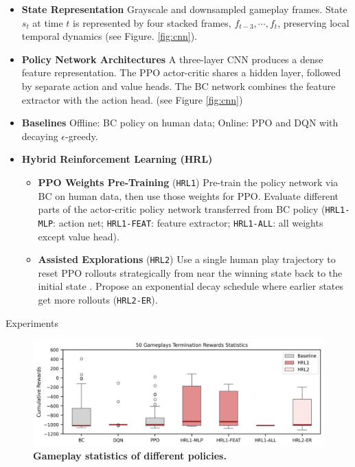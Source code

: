 \documentclass[final]{beamer}
\newlength{\colwidth}
\begin{document}
\begin{frame}[t]
\begin{columns}[t]
\begin{column}{\colwidth}
\begin{minipage}{\textwidth}
    \begin{itemize}

    \item \textbf{State Representation} Grayscale and downsampled gameplay frames. 
    State $s_t$ at time $t$ is represented by four stacked frames, 
    ${f_{t-3}, \cdots, f_t}$, preserving local temporal dynamics (see Figure. \ref{fig:cnn}).
    
    \item \textbf{Policy Network Architectures} 
    A three-layer CNN produces a 
    dense feature representation. The PPO actor-critic shares a hidden layer, 
    followed by separate action and value heads. The BC network combines the 
    feature extractor with the action head. (see Figure \ref{fig:cnn})

      \item \textbf{Baselines} Offline: BC policy on human data; 
      Online: PPO and DQN with decaying $\epsilon$-greedy.
      \item \textbf{Hybrid Reinforcement Learning (HRL)}
      \begin{itemize}
        \item \textbf{PPO Weights Pre-Training} (\texttt{HRL1}) Pre-train the policy 
        network via BC on human data, then use those weights for PPO. Evaluate different parts of the 
        actor-critic policy network transferred from BC policy (\texttt{HRL1-MLP}: action net; 
        \texttt{HRL1-FEAT}: feature extractor; \texttt{HRL1-ALL}: all weights except value head).
        \item \textbf{Assisted Explorations} (\texttt{HRL2}) Use a single human play 
        trajectory to reset PPO rollouts strategically from near the winning state back 
        to the initial state \cite{salimans2018learningmontezumasrevengesingle}. Propose 
        an exponential decay schedule where earlier states get more rollouts (\texttt{HRL2-ER}).
      \end{itemize}
    \end{itemize}
    
  \end{minipage}



  \begin{block}{Experiments}

    \begin{figure}[h]%
      \centering
      \includegraphics[width=\textwidth]{pics/cum_rewards.png}
      \caption{\textbf{Gameplay statistics of different policies.
      }}%
      \label{fig:res}%
  \end{figure}
  

\end{block}
\end{column}
\end{columns}
\end{frame}
\end{document}
